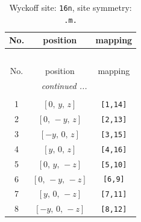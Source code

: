 \documentclass[fleqn,8pt]{jsarticle}
\begin{document}
\renewcommand{\arraystretch}{1.2}
\begin{longtable}{ccc}
\caption{Wyckoff site: {\tt 16n}, site symmetry: {\tt .m.}}
 \\
 \hline \hline
No. & position & mapping \\ \hline \endfirsthead

\multicolumn{2}{l}{\tablename\ \thetable{}} \\
 \hline \hline
No. & position & mapping \\ \hline \endhead

 \hline \hline
\multicolumn{2}{r}{\footnotesize\it continued ...} \\ \endfoot

 \hline \hline
\multicolumn{2}{r}{} \\ \endlastfoot

1 & $\left[ 0,\, y,\, z \right]$ & {\tt [1,14]} \\ \hline
2 & $\left[ 0,\, - y,\, z \right]$ & {\tt [2,13]} \\ \hline
3 & $\left[ - y,\, 0,\, z \right]$ & {\tt [3,15]} \\ \hline
4 & $\left[ y,\, 0,\, z \right]$ & {\tt [4,16]} \\ \hline
5 & $\left[ 0,\, y,\, - z \right]$ & {\tt [5,10]} \\ \hline
6 & $\left[ 0,\, - y,\, - z \right]$ & {\tt [6,9]} \\ \hline
7 & $\left[ y,\, 0,\, - z \right]$ & {\tt [7,11]} \\ \hline
8 & $\left[ - y,\, 0,\, - z \right]$ & {\tt [8,12]} \\
\end{longtable}
\renewcommand{\arraystretch}{1.2}
\end{document}
